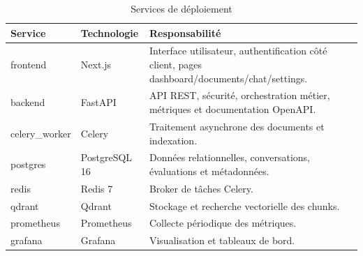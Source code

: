 \documentclass[12pt,a4paper,oneside]{report}
\begin{document}
\begin{table}[H]
  \centering
  \caption{Services de déploiement}
  \begin{tabularx}{\textwidth}{L{3cm}L{3cm}Y}
    \toprule
    \textbf{Service} & \textbf{Technologie} & \textbf{Responsabilité} \\
    \midrule
    frontend & Next.js & Interface utilisateur, authentification côté client, pages dashboard/documents/chat/settings. \\
    backend & FastAPI & API REST, sécurité, orchestration métier, métriques et documentation OpenAPI. \\
    celery\_worker & Celery & Traitement asynchrone des documents et indexation. \\
    postgres & PostgreSQL 16 & Données relationnelles, conversations, évaluations et métadonnées. \\
    redis & Redis 7 & Broker de tâches Celery. \\
    qdrant & Qdrant & Stockage et recherche vectorielle des chunks. \\
    prometheus & Prometheus & Collecte périodique des métriques. \\
    grafana & Grafana & Visualisation et tableaux de bord. \\
    \bottomrule
  \end{tabularx}
\end{table}
\end{document}

